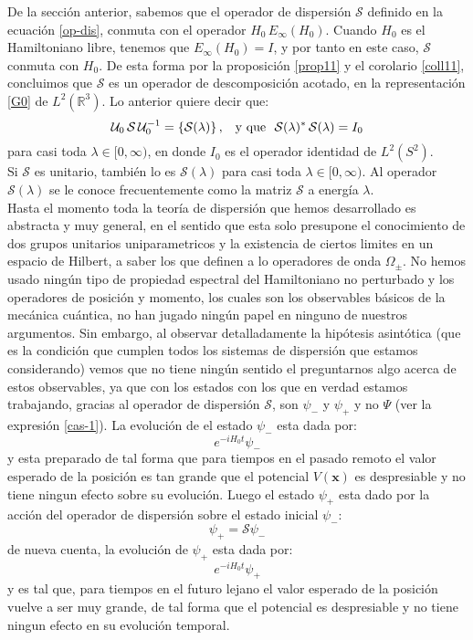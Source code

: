 \documentclass[12pt]{book}
\numberwithin{equation}{chapter}
\def\R{\mathbb{R}}
\def\S{\mathcal{S}}
\def\x{\mathbf{x}}
\def\O{\Omega}
\def\U{\mathcal{U}}
\begin{document}
De la secci\'on anterior, sabemos que el operador de dispersi\'on $\S$ definido en la ecuaci\'on \eqref{op-dis}, conmuta con el operador $H_{0} \, E_{\infty}(H_{0})$. Cuando $H_{0}$ es el Hamiltoniano libre, tenemos que $E_{\infty}(H_{0})= I$, y por tanto en este caso, $\S$ conmuta con $H_{0}$. De esta forma por la proposici\'on \ref{prop11} y el corolario \ref{coll11}, concluimos que $\S$ es un operador de descomposici\'on acotado, en la representaci\'on \eqref{G0}  de $L^{2}(\R^{3})$. Lo anterior quiere decir que:
\begin{equation}\label{s-esp-des}
\U_{0}\, \S \, \U_{0}^{-1} = \{ \S (\lambda) \} \,,\,\,\, \hbox{ y que } \,\, \S(\lambda)^{*}\, \S (\lambda)= I_{0}
\end{equation}
para casi toda $\lambda \in [0,\infty)$, en donde $I_{0}$ es el operador identidad de $L^{2}(S^{2})$.\\
Si $\S$ es unitario, tambi\'en lo es $\S(\lambda)$ para casi toda $\lambda \in [0,\infty)$. Al operador $\S(\lambda)$ se le conoce frecuentemente como la matriz $\S$ a energ\'ia $\lambda$.\\

Hasta el momento toda la teor\'ia de dispersi\'on que hemos desarrollado es abstracta y muy general, en el sentido que esta solo presupone el conocimiento de dos grupos unitarios uniparametricos y la existencia de ciertos limites en un espacio de Hilbert, a saber los que definen a lo operadores de onda $\O_{\pm}$. No hemos usado ning\'un tipo de propiedad espectral del Hamiltoniano no perturbado y los operadores de posici\'on y momento, los cuales son los observables b\'asicos de la mec\'anica cu\'antica, no han jugado ning\'un papel en ninguno de nuestros argumentos. Sin embargo, al observar detalladamente la hip\'otesis asint\'otica (que es la condici\'on que cumplen todos los sistemas de dispersi\'on que estamos considerando) vemos que no tiene ning\'un sentido el preguntarnos algo acerca de estos observables, ya que con los estados con los que en verdad estamos trabajando, gracias al operador de dispersi\'on $\S$, son $\psi_{-}$ y $\psi_{+}$ y no $\Psi$ (ver la expresi\'on \eqref{cas-1}). La evoluci\'on de el estado $\psi_{-}$ esta dada por:
$$ e^{-iH_{0}t} \psi_{-} $$ 
y esta preparado de tal forma que para tiempos en el pasado remoto el valor esperado de la posici\'on es tan grande que el potencial $V(\x)$ es despresiable y no tiene ningun efecto sobre su evoluci\'on. Luego el estado $\psi_{+}$ esta dado por la acci\'on del operador de dispersi\'on sobre el estado inicial $\psi_{-}$:
$$ \psi_{+}= \S \psi_{-} $$
de nueva cuenta, la evoluci\'on de $\psi_{+}$ esta dada por:
$$ e^{-iH_{0}t} \psi_{+} $$ 
y es tal que, para tiempos en el futuro lejano el valor esperado de la posici\'on vuelve a ser muy grande, de tal forma que el potencial es despresiable y no tiene ningun efecto en su evoluci\'on temporal.\\ 
\end{document}
